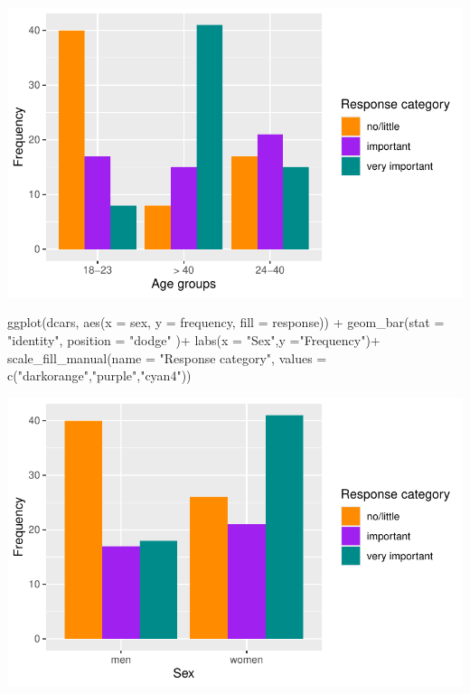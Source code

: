 \documentclass[
  letterpaper,
  DIV=11,
  numbers=noendperiod]{scrartcl}
\newenvironment{Shaded}{\begin{snugshade}}{\end{snugshade}}
\newcommand{\AttributeTok}[1]{\textcolor[rgb]{0.40,0.45,0.13}{#1}}
\newcommand{\FunctionTok}[1]{\textcolor[rgb]{0.28,0.35,0.67}{#1}}
\newcommand{\NormalTok}[1]{\textcolor[rgb]{0.00,0.23,0.31}{#1}}
\newcommand{\SpecialCharTok}[1]{\textcolor[rgb]{0.37,0.37,0.37}{#1}}
\newcommand{\StringTok}[1]{\textcolor[rgb]{0.13,0.47,0.30}{#1}}
\begin{document}
\includegraphics{index_files/figure-pdf/unnamed-chunk-25-1.pdf}

\begin{Shaded}
\begin{Highlighting}[]
 \FunctionTok{ggplot}\NormalTok{(dcars, }\FunctionTok{aes}\NormalTok{(}\AttributeTok{x =}\NormalTok{ sex,}
                   \AttributeTok{y =}\NormalTok{ frequency, }
                   \AttributeTok{fill =}\NormalTok{ response)) }\SpecialCharTok{+}
      \FunctionTok{geom\_bar}\NormalTok{(}\AttributeTok{stat =} \StringTok{"identity"}\NormalTok{,}
               \AttributeTok{position =} \StringTok{"dodge"}\NormalTok{ )}\SpecialCharTok{+}
   \FunctionTok{labs}\NormalTok{(}\AttributeTok{x =} \StringTok{"Sex"}\NormalTok{,}\AttributeTok{y =}\StringTok{"Frequency"}\NormalTok{)}\SpecialCharTok{+}
      \FunctionTok{scale\_fill\_manual}\NormalTok{(}\AttributeTok{name =} \StringTok{"Response category"}\NormalTok{,}
                        \AttributeTok{values =} \FunctionTok{c}\NormalTok{(}\StringTok{"darkorange"}\NormalTok{,}\StringTok{"purple"}\NormalTok{,}\StringTok{"cyan4"}\NormalTok{)) }
\end{Highlighting}
\end{Shaded}

\includegraphics{index_files/figure-pdf/unnamed-chunk-25-2.pdf}
\end{document}
